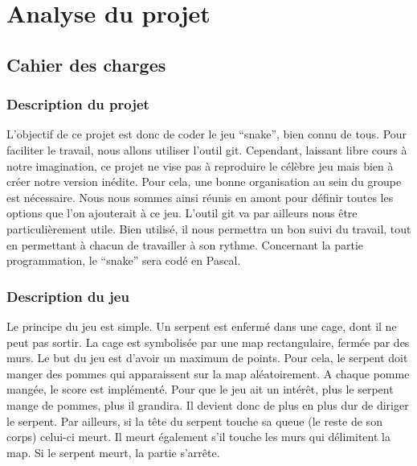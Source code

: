 \section{Analyse du projet}

    \subsection{Cahier des charges}
        \subsubsection{Description du projet}
             L'objectif de ce projet est donc de coder le jeu ``snake'', bien connu de tous. Pour faciliter le travail, nous allons utiliser l'outil git. Cependant, laissant libre cours à notre imagination, ce projet ne vise pas à reproduire le célèbre jeu mais bien à créer notre version inédite. Pour cela, une bonne organisation au sein du groupe est nécessaire. Nous nous sommes ainsi réunis en amont pour définir toutes les options que l'on ajouterait à ce jeu. L’outil git va par ailleurs nous être particulièrement utile. Bien utilisé, il nous permettra un bon suivi du travail, tout en permettant à chacun de travailler à son rythme. Concernant la partie programmation, le ``snake'' sera codé en Pascal. 
        
        \subsubsection{Description du jeu}
            Le principe du jeu est simple. Un serpent est enfermé dans une cage, dont il ne peut pas sortir. La cage est symbolisée par une map rectangulaire, fermée par des murs. Le but du jeu est d’avoir un maximum de points. Pour cela, le serpent doit manger des pommes qui apparaissent sur la map aléatoirement. A chaque pomme mangée, le score est implémenté. Pour que le jeu ait un intérêt, plus le serpent mange de pommes, plus il grandira. Il devient donc de plus en plus dur de diriger le serpent. Par ailleurs, si la tête du serpent touche sa queue (le reste de son corps) celui-ci meurt. Il meurt également s'il touche les murs qui délimitent la map. Si le serpent meurt, la partie s'arrête. 
            
